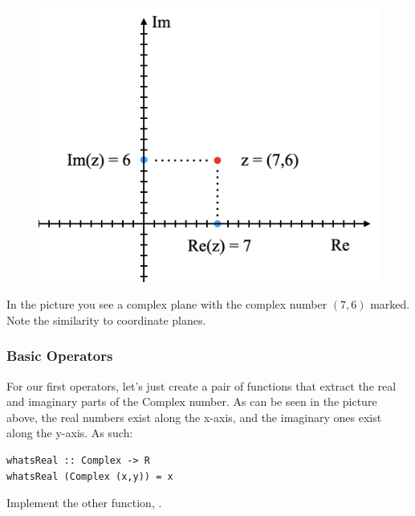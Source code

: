 \begin{figure}[h!]
    \centering
    \includegraphics[scale= 0.4]{Argand.png}
    \caption{}
    \label{argand}
\end{figure}


In the picture you see a complex plane with the complex number $(7,6)$ marked. Note the similarity to coordinate planes. 

\subsubsection{Basic Operators}

For our first operators, let's just create a pair of functions that extract the real and imaginary parts of the Complex number. As can be seen in the picture above, the real numbers exist along the x-axis, and the imaginary ones exist along the y-axis. As such:
\begin{verbatim}
whatsReal :: Complex -> R
whatsReal (Complex (x,y)) = x

\end{verbatim}

\begin{exercise}
Implement the other function, . 
\end{exercise}

